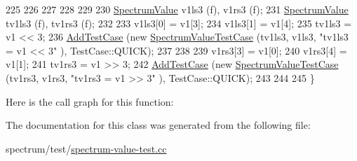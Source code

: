 \begin{DoxyCode}
225 
226 
227 
228 
229 
230   \hyperlink{classns3_1_1SpectrumValue}{SpectrumValue} v1ls3 (f), v1rs3 (f);
231   \hyperlink{classns3_1_1SpectrumValue}{SpectrumValue} tv1ls3 (f), tv1rs3 (f);
232 
233   v1ls3[0] = v1[3];
234   v1ls3[1] = v1[4];
235   tv1ls3 = v1 << 3;
236   \hyperlink{classns3_1_1TestCase_a3718088e3eefd5d6454569d2e0ddd835}{AddTestCase} (\textcolor{keyword}{new} \hyperlink{classSpectrumValueTestCase}{SpectrumValueTestCase} (tv1ls3, v1ls3, \textcolor{stringliteral}{"tv1ls3 = v1 << 3"}
      ), TestCase::QUICK);
237 
238 
239   v1rs3[3] = v1[0];
240   v1rs3[4] = v1[1];
241   tv1rs3 = v1 >> 3;
242   \hyperlink{classns3_1_1TestCase_a3718088e3eefd5d6454569d2e0ddd835}{AddTestCase} (\textcolor{keyword}{new} \hyperlink{classSpectrumValueTestCase}{SpectrumValueTestCase} (tv1rs3, v1rs3, \textcolor{stringliteral}{"tv1rs3 = v1 >> 3"}
      ), TestCase::QUICK);
243 
244 
245 \}
\end{DoxyCode}


Here is the call graph for this function\+:




The documentation for this class was generated from the following file\+:\begin{DoxyCompactItemize}
\item 
spectrum/test/\hyperlink{spectrum-value-test_8cc}{spectrum-\/value-\/test.\+cc}\end{DoxyCompactItemize}
